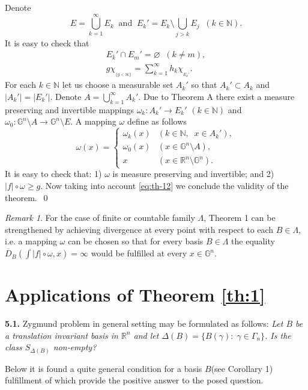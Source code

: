 \documentclass[12pt,reqno]{article}
\theoremstyle{remark}
\newtheorem{remark}{Remark}
\begin{document}
Denote
$$  E=\bigcup_{k=1}^\infty E_k \;\;\text{and}\;\; E_k'=E_k\setminus \bigcup_{j>k} E_j \;\; (k\in\mathbb{N}).        $$
It is easy to check that
\begin{gather*}
     E_k'\cap E_m'=\varnothing \;\; (k\neq m), \\
     g\chi_{{}_{\{g<\infty\}}}=\sum_{k=1}^\infty h_k\chi_{{}_{E_k'}}.
\end{gather*}
For each $k\in\mathbb{N}$ let us choose a measurable set $A_k'$ so that $A_k'\subset A_k$ and $|A_k'|=|E_k'|$. Denote $A=\bigcup\limits_{k=1}^\infty A_k'$. Due to Theorem A there exist a measure preserving and invertible mappings $\omega_k:A_k'\to E_k'$ $(k\in\mathbb{N})$ and $\omega_0:\mathbb{G}^n\setminus A\to\mathbb{G}^n\setminus E$. A mapping $\omega$ define as follows
$$  \omega(x)=\begin{cases}
        \omega_k(x) & (k\in\mathbb{N}, \;\; x\in A_k'), \\
        \omega_0(x) & (x\in\mathbb{G}^n\setminus A), \\
        x & (x \in \mathbb{R}^n\setminus \mathbb{G}^n).
            \end{cases}     $$
It is easy to check that: 1) $\omega$ is measure preserving and invertible; and 2)$|f|\circ\omega\geq g$. Now taking into account \eqref{eq:th-12} we conclude the validity of the theorem.\ \hfill \qed

\begin{remark}\label{rem:1-1}
For the case of finite or countable family $\Lambda$,  Theorem 1 can be strengthened by achieving divergence at every point with respect  to each $B\in\Lambda$, i.e. a mapping $\omega$  can be chosen so that for every basis $B\in\Lambda$ the equality $\overline{D}_B\left(\int |f|\circ \omega,x\right)=\infty$ would be fulfilled at every $x\in\mathbb{G}^n$.
\end{remark}



\section{Applications of Theorem \ref{th:1}}
\label{sec:5}

\noindent \textbf{5.1.} Zygmund problem in general setting may be formulated as follows: \emph{Let $B$ be a translation invariant basis in $\mathbb{R}^n$ and let  $\Delta(B)=\big\{B(\gamma):\;\gamma\in\Gamma_n\big\}$. Is the class $S_{\Delta(B)}$ non-empty? }

Below it is found  a quite general condition for a basis $B$(see Corollary 1) fulfillment of which provide the positive answer to the posed question.
\end{document}
